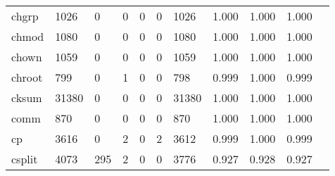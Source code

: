 \begin{longtable}{lp{1.10cm}p{1.10cm}p{1.10cm}p{1.10cm}p{1.10cm}p{1.10cm}p{1.10cm}p{1.10cm}p{1.10cm}p{1.10cm}}
chgrp     &                   1026 &                                  0 &                                 0 &                                0 &                                 0 &                            1026 &                          1.000 &                                 1.000 &                               1.000 \\
chmod     &                   1080 &                                  0 &                                 0 &                                0 &                                 0 &                            1080 &                          1.000 &                                 1.000 &                               1.000 \\
chown     &                   1059 &                                  0 &                                 0 &                                0 &                                 0 &                            1059 &                          1.000 &                                 1.000 &                               1.000 \\
chroot    &                    799 &                                  0 &                                 1 &                                0 &                                 0 &                             798 &                          0.999 &                                 1.000 &                               0.999 \\
cksum     &                  31380 &                                  0 &                                 0 &                                0 &                                 0 &                           31380 &                          1.000 &                                 1.000 &                               1.000 \\
comm      &                    870 &                                  0 &                                 0 &                                0 &                                 0 &                             870 &                          1.000 &                                 1.000 &                               1.000 \\
cp        &                   3616 &                                  0 &                                 2 &                                0 &                                 2 &                            3612 &                          0.999 &                                 1.000 &                               0.999 \\
csplit    &                   4073 &                                295 &                                 2 &                                0 &                                 0 &                            3776 &                          0.927 &                                 0.928 &                               0.927 \\

\end{longtable}

